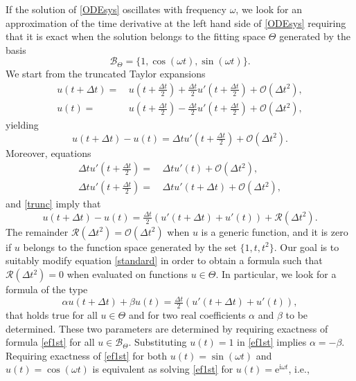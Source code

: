 \documentclass[twoside]{article}
\numberwithin{equation}{section}
\begin{document}
If the solution of \eqref{ODEsys} oscillates with frequency $\omega$, we look for an approximation of the time derivative at the left hand side of \eqref{ODEsys} requiring that it is exact when the solution belongs to the fitting space $\Theta$ generated by the basis
\begin{equation}\label{basis}
\mathcal{B}_\Theta=\{1,\cos(\omega t),\sin(\omega t)\}.
\end{equation}
 We start from the truncated Taylor expansions
\begin{align*}
u(t+\Delta t)=&\,u(t+\tfrac{\Delta t}2)+\tfrac{\Delta t}2u'(t+\tfrac{\Delta t}2)+\mathcal{O}(\Delta t^2),\\
u(t)=&\,u(t+\tfrac{\Delta t}2)-\tfrac{\Delta t}2u'(t+\tfrac{\Delta t}2)+\mathcal{O}(\Delta t^2),
\end{align*}
yielding
\begin{equation}\label{trunc}
u(t+\Delta t)-u(t)=\Delta t u'(t+\tfrac{\Delta t}2)+\mathcal{O}(\Delta t^2).
\end{equation}
Moreover, equations
\begin{align*}
\Delta t u'(t+\tfrac{\Delta t}2)=&\,{\Delta t} u'(t)+\mathcal{O}(\Delta t^2),\\
\Delta t u'(t+\tfrac{\Delta t}2)=&\,{\Delta t} u'(t+\Delta t)+\mathcal{O}(\Delta t^2),
\end{align*}
and \eqref{trunc} imply that
\begin{equation}\label{standard}
u(t+\Delta t)-u(t)=\tfrac{\Delta t}2 (u'(t+\Delta t)+u'(t))+\mathcal{R}(\Delta t^2).
\end{equation}
The remainder $\mathcal{R}(\Delta t^2)=\mathcal{O}(\Delta t^2)$ when $u$ is a generic function, and it is zero if $u$ belongs to the function space generated by the set $\{1,t,t^2\}$. Our goal is to suitably modify equation \eqref{standard} in order to obtain a formula such that $\mathcal{R}(\Delta t^2)=0$ when evaluated on functions $u\in\Theta$. In particular, we look for a formula of the type
\begin{equation}\label{ef1st}
\alpha u(t+\Delta t)+\beta u(t)=\tfrac{\Delta t}2 (u'(t+\Delta t)+u'(t)),
\end{equation}
that holds true for all $u\in\Theta$ and for two real coefficients $\alpha$ and $\beta$ to be determined. These two parameters are determined by requiring exactness of formula \eqref{ef1st} for all $u\in\mathcal{B}_\Theta$. Substituting $u(t)=1$ in \eqref{ef1st} implies $\alpha=-\beta$. Requiring exactness of \eqref{ef1st} for both $u(t)=\sin(\omega t)$ and $u(t)=\cos(\omega t)$ is equivalent as solving \eqref{ef1st} for $u(t)=\mathrm{e}^{\mathrm{i}\omega t}$, i.e.,
\end{document}
